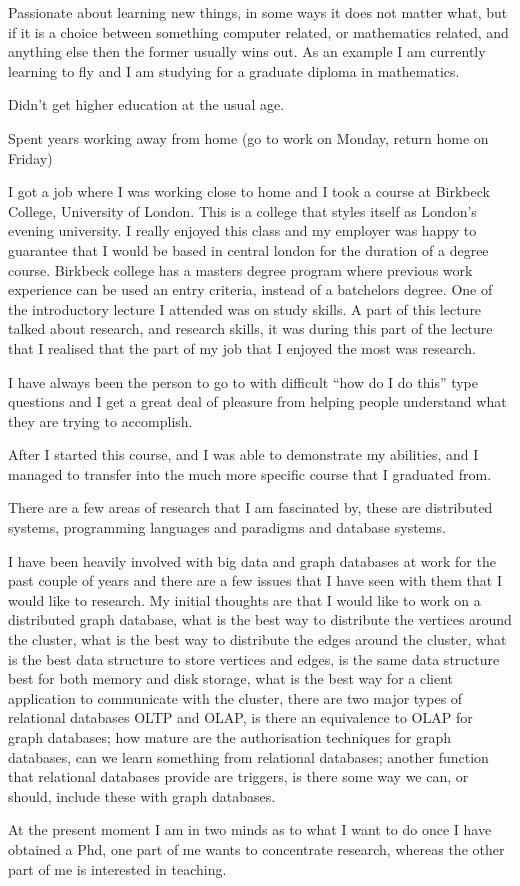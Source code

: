 \documentclass{letter}
\begin{document}
Passionate about learning new things, in some ways it does not matter what, but if it is a choice between something computer related, or mathematics related, and anything else then the former usually wins out. As an example I am currently learning to fly and I am studying for a graduate diploma in mathematics.
\par
Didn't get higher education at the usual age.
\par
Spent years working away from home (go to work on Monday, return home on Friday)
\par
I got a job where I was working close to home and I took a course at Birkbeck College, University of London. This is a college that styles itself as London's evening university. I really enjoyed this class and my employer was happy to guarantee that I would be based in central london for the duration of a degree course.  Birkbeck college has a masters degree program where previous work experience can be used an entry criteria, instead of a batchelors degree. One of the introductory lecture I attended was on study skills. A part of this lecture talked about research, and research skills, it was during this part of the lecture that I realised that the part of my job that I enjoyed the most was research. 
\par
I have always been the person to go to with difficult ``how do I do this'' type questions and I get a great deal of pleasure from helping people understand what they are trying to accomplish.
\par
After I started this course, and I was able to demonstrate my abilities, and I managed to transfer into the much more specific course that I graduated from.
\par
There are a few areas of research that I am fascinated by, these are distributed systems, programming languages and paradigms and database systems.
\par
I have been heavily involved with big data and graph databases at work for the past couple of years and there are a few issues that I have seen with them that I would like to research. My initial thoughts are that I would like to work on a distributed graph database, what is the best way to distribute the vertices around the cluster, what is the best way to distribute the edges around the cluster, what is the best data structure to store vertices and edges, is the same data structure best for both memory and disk storage, what is the best way for a client application to communicate with the cluster, there are two major types of relational databases OLTP and OLAP, is there an equivalence to OLAP for graph databases; how mature are the authorisation techniques for graph databases, can we learn something from relational databases; another function that relational databases provide are triggers, is there some way we can, or should, include these with graph databases.
\par
At the present moment I am in two minds as to what I want to do once I have obtained a Phd, one part of me wants to concentrate research, whereas the other part of me is interested in teaching.
\end{document}
